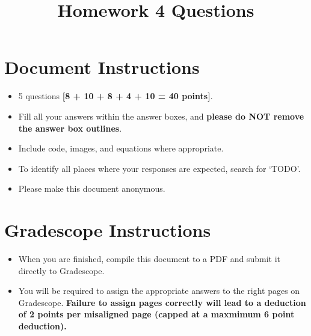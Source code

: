 \date{}

\title{\vspace{-2cm}Homework 4 Questions}



\maketitle
\thispagestyle{fancy}
\vspace{-3cm}

\section*{Document Instructions}
\begin{itemize}
  \item 5 questions \textbf{[8 + 10 + 8 + 4 + 10 = 40 points]}.
  \item Fill all your answers within the answer boxes, and \textbf{please do NOT remove the answer box outlines}.
  \item Include code, images, and equations where appropriate.
  \item To identify all places where your responses are expected, search for `TODO'.
  \item Please make this document anonymous.
\end{itemize}

\section*{ Gradescope Instructions}
\begin{itemize}
  \item When you are finished, compile this document to a PDF and submit it directly to Gradescope. 
  \item You will be required to assign the appropriate answers to the right pages on Gradescope. \textbf{Failure to assign pages correctly will lead to a deduction of 2 points per misaligned page (capped at a maxmimum 6 point deduction).}
\end{itemize}
\pagebreak








